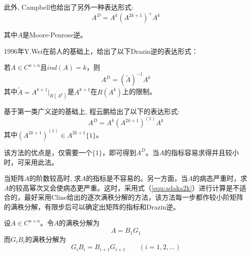 此外, Campbell也给出了另外一种表达形式:
\begin{equation}
A^D=A^k(A^{2k+1})^+A^k
\end{equation}\par
其中$A$是Moore-Penrose逆。\par
1996年Y.\nbs Wei在前人的基础上，给出了以下Drazin逆的表达形式：\par
若$A\in C^{n\times n}$且$ind(A)=k$，则
\begin{equation}
A^D=(\tilde{A})^{-1}A^k
\end{equation}
其中$\tilde{A}=A^{k+1}|_{R(A^k)}$是$A^{k+1}$在$R(A^k)$上的限制。\par
基于第一类广义逆的基础上, 程云鹏给出了以下的表达形式:
\begin{equation}\label{equ:adaka2k}
A^D=A^k(A^{2k+1})^{(1)}A^k
\end{equation}
其中$(A^{2k+1})^{(1)}\in A^{2k+1}\{1\}$。\par
该方法的优点是，仅需要一个$\{1\}$，即可得到$A^D$。当$A$的指标容易求得并且较小时，可采用此法。\par
当矩阵$A$的阶数较高时, 求$A$的指标是不容易的。另一方面，当$A$的病态严重时，求$A$的较高幂次又会使病态更严重。这时，采用式（\ref{equ:adaka2k}）进行计算是不适合的，最好采用Cline给出的逐次满秩分解的方法，该方法每一步都作较小阶矩阵的满秩分解，有限步后可以确定出矩阵的指标和Drazin逆。\par
设$A\in C^{n\times n}$。令$A$的满秩分解为
\begin{equation*}
A=B_1G_1
\end{equation*}
而$G_iB_i$的满秩分解为
\begin{equation*}
G_iB_i=B_{i+1}G_{i+1}\qquad (i=1,2,...)
\end{equation*}
